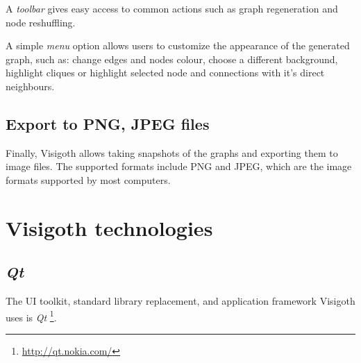 \documentclass[a4paper,11pt,titlepage]{article}
\let\stdsection\section         %
\renewcommand{\section}{\newpage\stdsection}
\newcommand{\buzz}[1]{\emph{#1}}
\newcommand{\Qt}{\buzz{Qt} }
\begin{document}
A \emph{toolbar} gives easy access to common actions such as graph regeneration and 
node reshuffling.

A simple \emph{menu} option allows users to customize the appearance of the generated graph, 
such as: change edges and nodes colour, choose a different background, highlight 
cliques or highlight selected node and connections with it's direct neighbours.

\subsection{Export to PNG, JPEG files}
Finally, Visigoth allows taking snapshots of the graphs and exporting them to image files. The supported formats include PNG and JPEG, which are the image formats supported by most computers.

\section{Visigoth technologies}

\subsection{\Qt}

The UI toolkit, standard library replacement, and application
framework Visigoth uses is \Qt \footnote{\url{http://qt.nokia.com/}}.
\end{document}

